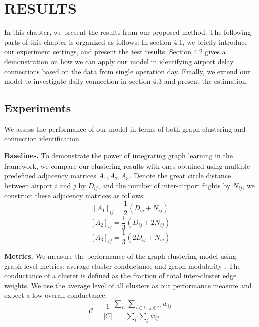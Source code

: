 \chapter{RESULTS}
\pagestyle{fancy}

In this chapter, we present the results from our proposed method. The following parts of this chapter is organized as follows: In section 4.1, we briefly introduce our experiment settings, and present the test results. Section 4.2 gives a demonstration on how we can apply our model in identifying airport delay connections based on the data from single operation day. Finally, we extend our model to investigate daily connection in section 4.3 and present the estimation.

\section{Experiments}

We assess the performance of our model in terms of both graph clustering and connection identification. 

\noindent\textbf{Baselines.} To demonstrate the power of integrating graph learning in the framework, we compare our clustering results with ones obtained using multiple predefined adjacency matrices $A_1, A_2, A_3$. Denote the great circle distance between airport $i$ and $j$ by $D_{ij}$, and the number of inter-airport flights by $N_{ij}$, we construct these adjacency matrices as follows:
\begin{equation}
    \left[A_1\right]_{ij}=\frac{1}{2}(D_{ij}+N_{ij})
\end{equation}
\begin{equation}
    \left[A_2\right]_{ij}=\frac{1}{3}(D_{ij}+2N_{ij})
\end{equation}
\begin{equation}
    \left[A_3\right]_{ij}=\frac{1}{3}(2D_{ij}+N_{ij})
\end{equation}

\noindent\textbf{Metrics.} We measure the performance of the graph clustering model using graph-level metrics: average cluster conductance \citep{yang2015defining} and graph modularity \citep{newman2006modularity}. The conductance of a cluster is defined as the fraction of total inter-cluster edge weights. We use the average level of all clusters as our performance measure and expect a low overall conductance.
\begin{equation}
    \mathcal{C}=\frac{1}{|C|}\frac{\sum_C\sum_{i\in C,j\notin C}w_{ij}}{\sum_i\sum_j w_{ij}}
\end{equation}


